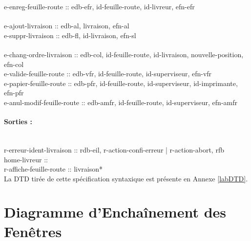 \documentclass{report}
\begin{document}
e-enreg-feuille-route :: edb-efr, id-feuille-route, id-livreur, efn-efr\\
~~\\
e-ajout-livraison :: edb-al, livraison, efn-al\\
e-suppr-livraison :: edb-fl, id-livraison, efn-sl\\
~~\\
e-chang-ordre-livraison :: edb-col, id-feuille-route, id-livraison, nouvelle-position, efn-col\\
e-valide-feuille-route :: edb-vfr, id-feuille-route, id-superviseur, efn-vfr\\
e-papier-feuille-route :: edb-pfr, id-feuille-route, id-superviseur, id-imprimante, efn-pfr\\
e-anul-modif-feuille-route :: edb-amfr, id-feuille-route, id-superviseur, efn-amfr\\

\paragraph{Sorties :}
~~\\
r-erreur-ident-livraison :: rdb-eil, r-action-confi-erreur | r-action-abort, rfb\\
home-livreur :: \\
r-affiche-feuille-route :: livraison*\\

La DTD tirée de cette spécification syntaxique est présente en Annexe \ref{labDTD}.

\pagebreak

\section{Diagramme d'Enchaînement des Fenêtres}
\end{document}
